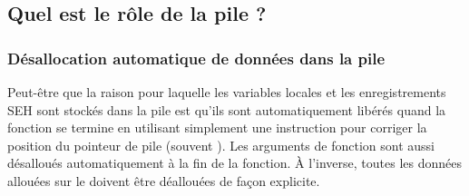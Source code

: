 
\subsection{Quel est le rôle de la pile ?}



\EN{}
\RU{}
\PTBR{}




\subsubsection{Désallocation automatique de données dans la pile}

Peut-être que la raison pour laquelle les variables locales et les enregistrements SEH sont stockés dans la
pile est qu'ils sont automatiquement libérés quand la fonction se termine en utilisant simplement une
instruction pour corriger la position du pointeur de pile (souvent \ADD).
Les arguments de fonction sont aussi désalloués automatiquement à la fin de la fonction.
À l'inverse, toutes les données allouées sur le  doivent être déallouées de façon explicite.

\EN{}
\RU{}
\PTBR{}


